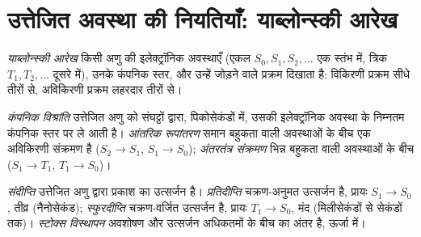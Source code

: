 \section{उत्तेजित अवस्था की नियतियाँ: याब्लोन्स्की आरेख}

\begin{definition}[याब्लोन्स्की आरेख]\label{def:b3:electronic-spectroscopy:jablonski}
\emph{याब्लोन्स्की आरेख} किसी अणु की इलेक्ट्रॉनिक अवस्थाएँ
(एकल $S_0, S_1, S_2, \dots$ एक स्तंभ में, त्रिक $T_1, T_2,
\dots$ दूसरे में), उनके कंपनिक स्तर, और उन्हें जोड़ने वाले प्रक्रम दिखाता है:
विकिरणी प्रक्रम सीधे तीरों से, अविकिरणी प्रक्रम लहरदार तीरों से।
\end{definition}

\begin{definition}[अविकिरणी प्रक्रम]\label{def:b3:electronic-spectroscopy:radiationless}
\emph{कंपनिक विश्रांति} उत्तेजित अणु को
संघट्टों द्वारा, पिकोसेकंडों में, उसकी इलेक्ट्रॉनिक अवस्था के निम्नतम कंपनिक स्तर पर ले आती है।
\emph{आंतरिक रूपांतरण}
समान बहुकता वाली अवस्थाओं के बीच एक अविकिरणी संक्रमण है
($S_2 \to S_1$, $S_1 \to S_0$); \emph{अंतरतंत्र
संक्रमण} भिन्न बहुकता वाली अवस्थाओं के बीच
($S_1 \to T_1$, $T_1 \to S_0$)।
\end{definition}

\begin{definition}[संदीप्ति, प्रतिदीप्ति, स्फुरदीप्ति, स्टोक्स विस्थापन]\label{def:b3:electronic-spectroscopy:luminescence}
\emph{संदीप्ति} उत्तेजित अणु द्वारा प्रकाश का उत्सर्जन है।
\emph{प्रतिदीप्ति} चक्रण-अनुमत उत्सर्जन है,
प्रायः $S_1 \to S_0$, तीव्र (नैनोसेकंड); \emph{स्फुरदीप्ति}
चक्रण-वर्जित उत्सर्जन है, प्रायः $T_1 \to S_0$, मंद (मिलीसेकंडों से
सेकंडों तक)। \emph{स्टोक्स विस्थापन} अवशोषण और उत्सर्जन
अधिकतमों के बीच का अंतर है, ऊर्जा में।
\end{definition}

